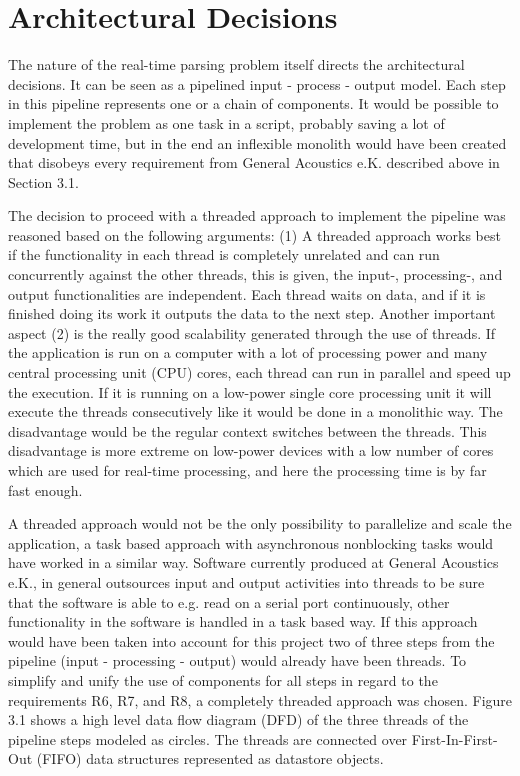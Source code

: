 \section{Architectural Decisions}
The nature of the real-time parsing problem itself directs the architectural decisions. It can be seen as a pipelined input - process - output model. Each step in this pipeline represents one or a chain of components. It would be possible to implement the problem as one task in a script, probably saving a lot of development time, but in the end an inflexible monolith would have been created that disobeys every requirement from General Acoustics e.K. described above in Section 3.1.

The decision to proceed with a threaded approach to implement the pipeline was reasoned based on the following arguments: (1) A threaded approach works best if the functionality in each thread is completely unrelated and can run concurrently against the other threads, this is given, the input-, processing-, and output functionalities are independent. Each thread waits on data, and if it is finished doing its work it outputs the data to the next step. Another important aspect (2) is the really good scalability generated through the use of threads. If the application is run on a computer with a lot of processing power and many central processing unit (CPU) cores, each thread can run in parallel and speed up the execution. If it is running on a low-power single core processing unit it will execute the threads consecutively like it would be done in a monolithic way. The disadvantage would be the regular context switches between the threads. This disadvantage is more extreme on low-power devices with a low number of cores which are used for real-time processing, and here the processing time is by far fast enough.

A threaded approach would not be the only possibility to parallelize and scale the application, a task based approach with asynchronous nonblocking tasks would have worked in a similar way. Software currently produced at General Acoustics e.K., in general outsources input and output activities into threads to be sure that the software is able to e.g. read on a serial port continuously, other functionality in the software is handled in a task based way. If this approach would have been taken into account for this project two of three steps from the pipeline (input - processing - output) would already have been threads. To simplify and unify the use of components for all steps in regard to the requirements R6, R7, and R8, a completely threaded approach was chosen. Figure 3.1 shows a high level data flow diagram (DFD) of the three threads of the pipeline steps modeled as circles. The threads are connected over First-In-First-Out (FIFO) data structures represented as datastore objects. 

